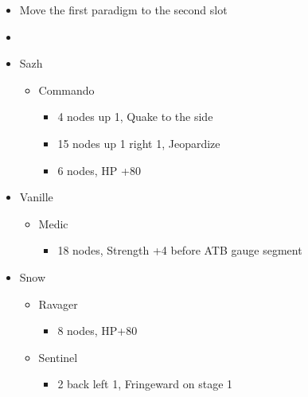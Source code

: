 \begin{menu}
\begin{multicols}{2}
\begin{itemize}
    \paradigm
    \begin{itemize}
        \item Move the first paradigm to the second slot
        \item {}%
{\paradigmline{(\syn)}{\sab}{\rav}}%
{\paradigmline{\com}{\med}{\com}}%
{\paradigmline{\syn}{\med}{\com}}%
{\paradigmline{\com}{\sab}{\com}}%
{\paradigmline[5]{\textit{\syn}}{\textit{\sab}}{\textit{\com}}}%
{\paradigmline{\com}{\rav}{\com}}
    \end{itemize}
    \crystarium
    \begin{itemize}
        \item Sazh
        \begin{itemize}
            \item Commando
            \begin{itemize}
                \item 4 nodes up 1, Quake to the side
                \item 15 nodes up 1 right 1, Jeopardize
                \item 6 nodes, HP +80
            \end{itemize}
        \end{itemize}
        \item Vanille
        \begin{itemize}
            \item Medic
            \begin{itemize}
                \item 18 nodes, Strength +4 before ATB gauge segment
            \end{itemize}
        \end{itemize}
        \item Snow
        \begin{itemize}
            \item Ravager
            \begin{itemize}
                \item 8 nodes, HP+80
            \end{itemize}
            \item Sentinel
            \begin{itemize}
                \item 2 back left 1, Fringeward on stage 1

\end{itemize}
\end{itemize}
\end{itemize}
\end{itemize}
\end{multicols}
\end{menu}
